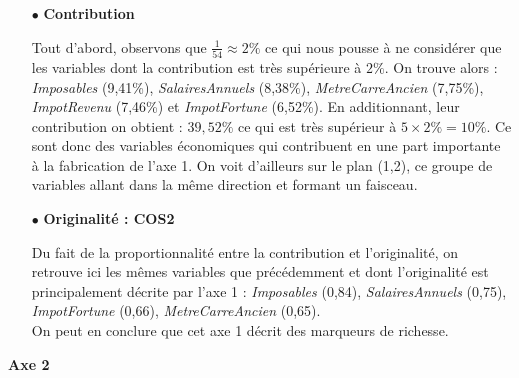 \documentclass{article}
\begin{document}
\begin{itemize}
	\item[$\bullet$] \textbf{Contribution}

	Tout d'abord, observons que $ \frac{1}{54}\approx 2\%$ ce qui nous pousse à ne considérer que les variables dont la contribution est très supérieure à $2\%$. On trouve alors : \emph{Imposables} (9,41\%), \emph{SalairesAnnuels} (8,38\%), \emph{MetreCarreAncien} (7,75\%), \emph{ImpotRevenu} (7,46\%) et \emph{ImpotFortune} (6,52\%). En additionnant, leur contribution on obtient : $39,52\%$ ce qui est très supérieur à $5\times 2\%=10\%$. Ce sont donc des variables économiques qui contribuent en une part importante à la fabrication de l'axe 1. On voit d'ailleurs sur le plan (1,2), ce groupe de variables allant dans la même direction et formant un faisceau.

	\item[$\bullet$] \textbf{Originalité : COS2}
	
	Du fait de la proportionnalité entre la contribution et l'originalité, on retrouve ici les mêmes variables que précédemment et dont l'originalité est principalement décrite par l'axe 1 : \emph{Imposables} (0,84), \emph{SalairesAnnuels} (0,75), \emph{ImpotFortune} (0,66), \emph{MetreCarreAncien} (0,65). \\
	
On peut en conclure que cet axe 1 décrit des marqueurs de richesse.
	
\end{itemize}

\bigskip

{\large \textbf{Axe 2}}
\end{document}
